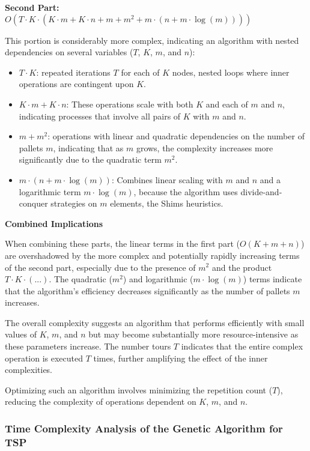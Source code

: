 \documentclass[preprint,authoryear]{elsarticle}
\begin{document}
{\textbf{Second Part:} $O(T \cdot K \cdot (K \cdot m + K \cdot n + m + m^2 + m \cdot (n + m \cdot \log(m))))$

This portion is considerably more complex, indicating an algorithm with nested dependencies on several variables ($T$, $K$, $m$, and $n$):

\begin{itemize}
	\item $T \cdot K$: repeated iterations $T$ for each of $K$ nodes, nested loops where inner operations are contingent upon $K$.
	\item $K \cdot m + K \cdot n$: These operations scale with both $K$ and each of $m$ and $n$, indicating processes that involve all pairs of $K$ with $m$ and $n$.
	\item $m + m^2$: operations with linear and quadratic dependencies on the number of pallets $m$, indicating that as $m$ grows, the complexity increases more significantly due to the quadratic term $m^2$.
	\item $m \cdot (n + m \cdot \log(m))$: Combines linear scaling with $m$ and $n$ and a logarithmic term $m \cdot \log(m)$, because the algorithm uses divide-and-conquer strategies on $m$ elements, the Shims heuristics.
\end{itemize}

\textbf{Combined Implications}

When combining these parts, the linear terms in the first part ($O(K+m+n)$) are overshadowed by the more complex and potentially rapidly increasing terms of the second part, especially due to the presence of $m^2$ and the product $T \cdot K \cdot (...)$. The quadratic ($m^2$) and logarithmic ($m \cdot \log(m)$) terms indicate that the algorithm's efficiency decreases significantly as the number of pallets $m$ increases.

The overall complexity suggests an algorithm that performs efficiently with small values of $K$, $m$, and $n$ but may become substantially more resource-intensive as these parameters increase. The number tours $T$ indicates that the entire complex operation is executed $T$ times, further amplifying the effect of the inner complexities.

Optimizing such an algorithm involves minimizing the repetition count ($T$), reducing the complexity of operations dependent on $K$, $m$, and $n$.


\subsubsection{Time Complexity Analysis of the Genetic Algorithm for TSP}
\label{ga_tsp}

}
\end{document}
